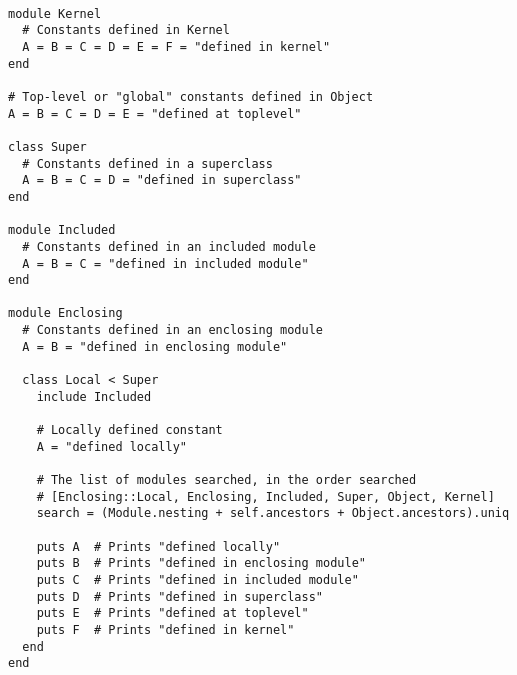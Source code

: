   \begin{latexonly}
    \begin{lstlisting}

module Kernel
  # Constants defined in Kernel
  A = B = C = D = E = F = "defined in kernel"
end

# Top-level or "global" constants defined in Object
A = B = C = D = E = "defined at toplevel"

class Super
  # Constants defined in a superclass
  A = B = C = D = "defined in superclass"
end

module Included
  # Constants defined in an included module
  A = B = C = "defined in included module"
end

module Enclosing
  # Constants defined in an enclosing module
  A = B = "defined in enclosing module"

  class Local < Super
    include Included

    # Locally defined constant
    A = "defined locally"

    # The list of modules searched, in the order searched
    # [Enclosing::Local, Enclosing, Included, Super, Object, Kernel]
    search = (Module.nesting + self.ancestors + Object.ancestors).uniq

    puts A  # Prints "defined locally"
    puts B  # Prints "defined in enclosing module"
    puts C  # Prints "defined in included module"
    puts D  # Prints "defined in superclass"
    puts E  # Prints "defined at toplevel"
    puts F  # Prints "defined in kernel"
  end
end

    \end{lstlisting}
  \end{latexonly}
